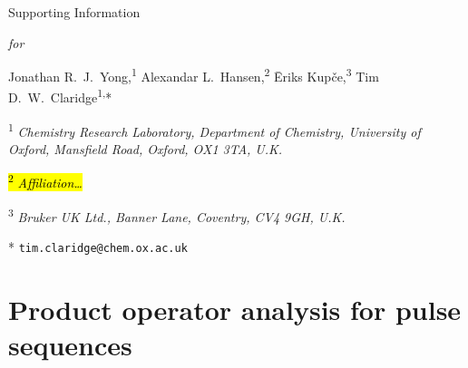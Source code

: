 \newcommand{\sectionbreak}{\clearpage}
\renewcommand*{\thefigure}{S\arabic{figure}}
\renewcommand*{\thetable}{S\arabic{table}}
\renewcommand*{\thepage}{S\arabic{page}}
\setcounter{page}{1}
\setcounter{figure}{0}
\setcounter{table}{0}
\onehalfspacing
\hspace{0pt}
\vfill
\begin{center}
    \huge
    Supporting Information

    \textit{for}

    \hsqctitle{}

    \vspace{1cm}

    \Large Jonathan R.\ J.\ Yong,\textsuperscript{1} Alexandar L.\ Hansen,\textsuperscript{2} {\=E}riks Kup{\v{c}}e,\textsuperscript{3} Tim D.\ W.\ Claridge\textsuperscript{1,}*

    \vspace{1cm}

    \large \textsuperscript{1} \textit{Chemistry Research Laboratory, Department of Chemistry, University of Oxford, Mansfield Road, Oxford, OX1 3TA, U.K.}

    \hl{\textsuperscript{2} \textit{Affiliation\ldots}}

    \textsuperscript{3} \textit{Bruker UK Ltd., Banner Lane, Coventry, CV4 9GH, U.K.}

    * \texttt{tim.claridge@chem.ox.ac.uk}
\end{center}
\thispagestyle{empty}
\vfill
\hspace{0pt}
\newpage

\tableofcontents

\newpage

\section{Product operator analysis for pulse sequences}

